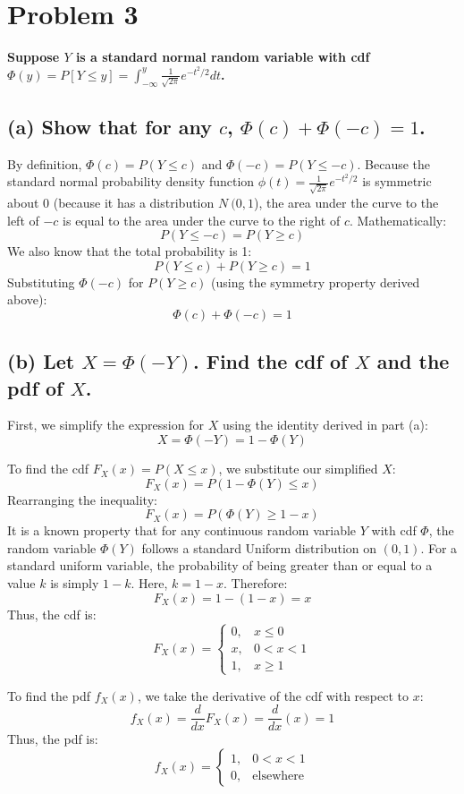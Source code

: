 \documentclass[12pt]{article}
\begin{document}
\newpage

\section*{Problem 3}
\textbf{Suppose $Y$ is a standard normal random variable with cdf $\Phi(y) = P[Y \le y] = \int_{-\infty}^{y} \frac{1}{\sqrt{2\pi}} e^{-t^2/2} dt$.}

\subsection*{(a) Show that for any $c$, $\Phi(c) + \Phi(-c) = 1$.}
By definition, $\Phi(c) = P(Y \le c)$ and $\Phi(-c) = P(Y \le -c)$.
Because the standard normal probability density function $\phi(t) = \frac{1}{\sqrt{2\pi}}e^{-t^2/2}$ is symmetric about 0 (because it has a distribution $N~(0,1$), the area under the curve to the left of $-c$ is equal to the area under the curve to the right of $c$.
Mathematically:
\[ P(Y \le -c) = P(Y \ge c) \]
We also know that the total probability is 1:
\[ P(Y \le c) + P(Y \ge c) = 1 \]
Substituting $\Phi(-c)$ for $P(Y \ge c)$ (using the symmetry property derived above):
\[ \Phi(c) + \Phi(-c) = 1 \]

\subsection*{(b) Let $X = \Phi(-Y)$. Find the cdf of $X$ and the pdf of $X$.}
First, we simplify the expression for $X$ using the identity derived in part (a):
\[X = \Phi(-Y) = 1 - \Phi(Y) \]


\noindent To find the cdf $F_X(x) = P(X \le x)$, we substitute our simplified $X$:
\[ F_X(x) = P(1 - \Phi(Y) \le x) \]
Rearranging the inequality:
\[ F_X(x) = P(\Phi(Y) \ge 1 - x) \]
It is a known property that for any continuous random variable $Y$ with cdf $\Phi$, the random variable $\Phi(Y)$ follows a standard Uniform distribution on $(0,1)$.
For a standard uniform variable, the probability of being greater than or equal to a value $k$ is simply $1-k$. Here, $k = 1-x$.
Therefore:
\[ F_X(x) = 1 - (1 - x) = x \]
Thus, the cdf is:
\[ F_X(x) = \begin{cases} 0, & x \le 0 \\ x, & 0 < x < 1 \\ 1, & x \ge 1 \end{cases} \]

\noindent To find the pdf $f_X(x)$, we take the derivative of the cdf with respect to $x$:
\[ f_X(x) = \frac{d}{dx} F_X(x) = \frac{d}{dx}(x) = 1 \]
Thus, the pdf is:
\[ f_X(x) = \begin{cases} 1, & 0 < x < 1 \\ 0, & \text{elsewhere} \end{cases} \]
\end{document}
